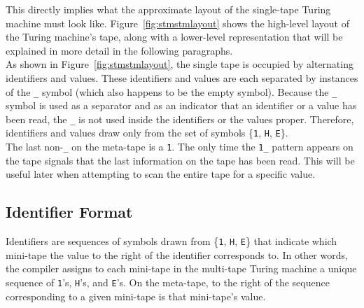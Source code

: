 \documentclass[11pt]{report}
\begin{document}
This directly implies what the approximate layout of the single-tape Turing machine must look like. Figure~\ref{fig:stmstmlayout} shows the high-level layout of the Turing machine's tape, along with a lower-level representation that will be explained in more detail in the following paragraphs. \\

As shown in Figure~\ref{fig:stmstmlayout}, the single tape is occupied by alternating identifiers and values. These identifiers and values are each separated by instances of the \texttt{\_} symbol (which also happens to be the empty symbol). Because the \texttt{\_} symbol is used as a separator and as an indicator that an identifier or a value has been read, the \texttt{\_} is not used inside the identifiers or the values proper. Therefore, identifiers and values draw only from the set of symbols \{\texttt{1}, \texttt{H}, \texttt{E}\}. \\

The last non-\texttt{\_} on the meta-tape is a \texttt{1}. The only time the \texttt{1\_} pattern appears on the tape signals that the last information on the tape has been read. This will be useful later when attempting to scan the entire tape for a specific value.

\subsection{Identifier Format}

Identifiers are sequences of symbols drawn from \{\texttt{1}, \texttt{H}, \texttt{E}\} that indicate which mini-tape the value to the right of the identifier corresponds to. In other words, the compiler assigns to each mini-tape in the multi-tape Turing machine a unique sequence of \texttt{1}'s, \texttt{H}'s, and \texttt{E}'s. On the meta-tape, to the right of the sequence corresponding to a given mini-tape is that mini-tape's value. \\
\end{document}
